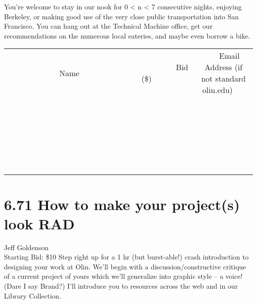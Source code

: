 \documentclass[11pt]{article}
\begin{document}
You're welcome to stay in our nook for 0 < n < 7 consecutive nights, enjoying Berkeley, or making good use of the very close public transportation into San Francisco. You can hang out at the Technical Machine office, get our recommendations on the numerous local eateries, and maybe even borrow a bike.
\\[6ex]
\begin{tabular}{c c c}
~~~~~~~~~~~~~Name~~~~~~~~~~~~~ & ~~~~~~~~~Bid (\$)~~~~~~~~~  & ~~~Email Address (if not standard olin.edu)~~~\\
 & & \\
\hline
 & & \\
\hline
 & & \\
\hline
 & & \\
\hline
 & & \\
\hline
 & & \\
\hline
 & & \\
\hline
 & & \\
\hline
 & & \\
\hline
 & & \\
\hline
 & & \\
\hline
 & & \\
\hline
 & & \\
\hline
 & & \\
\hline
 & & \\
\hline
 & & \\
\hline
 & & \\
\hline
 & & \\
\hline
 & & \\
\hline
 & & \\
\hline
 & & \\
\hline
 & & \\
\hline
 & & \\
\hline
 & & \\
\hline
 & & \\
\hline
 & & \\
\hline
\end{tabular}
\newpage
\section*{6.71 How to make your project(s) look RAD}
Jeff Goldenson
\\
Starting Bid: \$10
\newline
Step right up for a 1 hr (but burst-able!) crash introduction to designing your work at Olin.  We'll begin with a discussion/constructive critique of a current project of yours which we'll generalize into graphic style -- a voice!  (Dare I say Brand?) I'll introduce you to resources across the web and in our Library Collection. 
\end{document}
